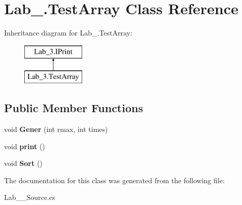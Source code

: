 \hypertarget{class_lab__3_1_1_test_array}{}\section{Lab\+\_.\+Test\+Array Class Reference}
\label{class_lab__3_1_1_test_array}
Inheritance diagram for Lab\+\_.\+Test\+Array\+:\begin{figure}[H]
\begin{center}
\leavevmode
\includegraphics[height=2.000000cm]{class_lab__3_1_1_test_array}
\end{center}
\end{figure}
\subsection*{Public Member Functions}
\begin{DoxyCompactItemize}
\item 
\mbox{\label{class_lab__3_1_1_test_array_a6e4384a2b48ea601c8cc3fcbfefbdb15}} 
void {\bfseries Gener} (int rmax, int times)
\item 
\mbox{\label{class_lab__3_1_1_test_array_ab3fec5626a043e0d31e40634698e3c24}} 
void {\bfseries print} ()
\item 
\mbox{\label{class_lab__3_1_1_test_array_a10bf97ffef85d7548db03396342980ea}} 
void {\bfseries Sort} ()
\end{DoxyCompactItemize}


The documentation for this class was generated from the following file\+:\begin{DoxyCompactItemize}
\item 
Lab\+\_\+\_\+\+Source.\+cs\end{DoxyCompactItemize}
